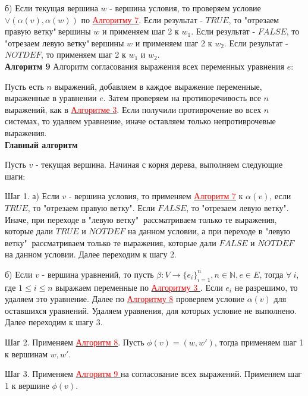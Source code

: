 \documentclass[12pt]{article}
\begin{document}
        б) Если текущая вершина $w$ - вершина условия, то проверяем условие $\vee(\alpha(v),\alpha(w))$ по \hyperlink{a7}{ \textcolor{red}{Алгоритму 7}}. Если результат - $TRUE$, то "отрезаем правую ветку"$\:$вершины $w$ и применяем шаг 2 к $w_{1}$. Если результат - $FALSE$, то "отрезаем левую ветку"$\:$вершины $w$ и применяем шаг 2 к $w_{2}$. Если результат - $NOTDEF$, то применяем шаг 2 к $w_{1}$ и $w_{2}$.
      \\
      
      \hypertarget{a9}{{\bf Алгоритм 9}} Алгоритм согласования выражения всех переменных уравнения $e$:
      
      Пусть есть $n$ выражений, добавляем в каждое выражение переменные, выраженные в уравнении $e$. Затем проверяем на противоречивость все $n$ выражений, как в  \hyperlink{a3}{ \textcolor{red}{Алгоритме 3}}. Если получили противрочение во всех $n$ системах, то удаляем уравнение, иначе оставляем только непротиврочевые выражения.
      \\
      
     {\bf Главный  алгоритм} 
     
     Пусть $v$ - текущая вершина.
     Начиная с корня дерева, выполняем следующие шаги:
     
     Шаг 1. а) Если $v$ - вершина условия, то применяем  \hyperlink{a7}{ \textcolor{red}{Алгоритм 7}} к  $\alpha(v)$, если $TRUE$, то "отрезаем правую ветку".  Если $FALSE$, то "отрезаем левую ветку". Иначе, при переходе в "левую ветку"$\:$ рассматриваем только те выражения, которые дали $TRUE$ и $NOTDEF$ на данном условии, а при переходе в "левую ветку"$\:$ рассматриваем только те выражения, которые дали $FALSE$ и $NOTDEF$ на данном условии. Далее переходим к шагу 2.
     
     б) Если $v$ - вершина уравнений, то пусть $\beta : V \rightarrow \lbrace  e_{i}  \rbrace_{i=1}^{n}, n \in \mathbb{N}, e \in E$, тогда $\forall \: i$, где $ 1 \leq i \leq n$ выражаем переменные по \hyperlink{a3}{ \textcolor{red}{Алгоритму 3 }}. Если $e_{i} $ не разрешимо, то удаляем это уравнение. Далее по \hyperlink{a8}{ \textcolor{red}{Алгоритму 8}} проверяем условие $\alpha(v)$ для оставшихся уравнений. Удаляем уравнения, для которых условие не выполнено. Далее переходим к шагу 3.
          
     Шаг 2. Применяем  \hyperlink{a8}{ \textcolor{red}{Алгоритм 8}}. Пусть $\phi(v)=(w,w')$, тогда применяем шаг 1 к вершинам $w, w'$.
     
     Шаг 3. Применяем  \hyperlink{a9}{ \textcolor{red}{Алгоритм 9 }} на согласование  всех выражений. Применяем шаг 1 к вершине $\phi(v)$.
     
     
     
     
     
\end{document}
